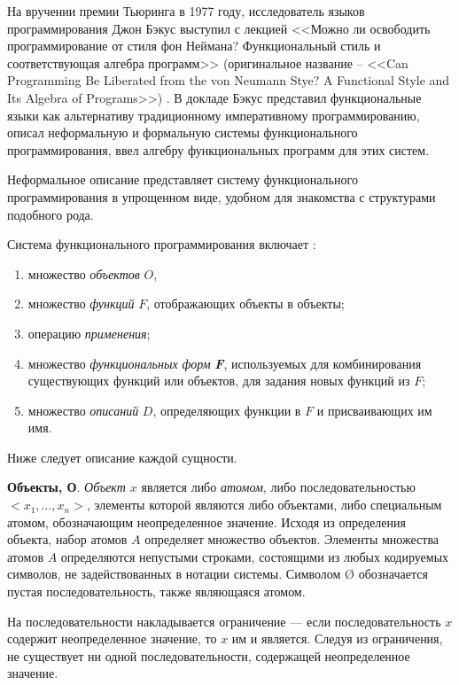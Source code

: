 На вручении премии Тьюринга в 1977 году, исследователь языков программирования Джон Бэкус
выступил с лекцией <<Можно ли освободить программирование от стиля фон Неймана? Функциональный
стиль и соответствующая алгебра программ>> (оригинальное название -- <<Can 
Programming Be Liberated from the von Neumann Stye? A Functional Style and
Its Algebra of Programs>>) \cite{backus77}. В докладе Бэкус представил функциональные языки
как альтернативу традиционному императивному программированию, описал
неформальную и формальную системы функционального программирования, ввел
алгебру функциональных программ для этих систем.

Неформальное описание представляет систему функционального программирования
в упрощенном виде, удобном для знакомства с структурами подобного рода.

Система функционального программирования включает \cite[с.~620]{backus77}:
\begin{enumerate}
    \item множество \textit{объектов} $O$,
    \item множество \textit{функций} $F$, отображающих объекты в объекты;
    \item операцию \textit{применения};
    \item множество \textit{функциональных форм} \textit{\textbf{F}}, 
    используемых для комбинирования существующих функций или объектов,
    для задания новых функций из $F$;
    \item множество \textit{описаний} $D$, определяющих функции в $F$ и присваивающих им имя.
\end{enumerate}

Ниже следует описание каждой сущности.

\textbf{Объекты, О}. \textit{Объект $x$} является либо \textit{атомом},
либо последовательностью $<x_1, \dots, x_n>$, элементы которой являются
либо объектами, либо специальным атомом, обозначающим неопределенное значение.
Исходя из определения объекта, набор атомов $A$ определяет множество
объектов. Элементы множества атомов $A$ определяются непустыми строками,
состоящими из любых кодируемых символов, не задействованных в нотации системы.
Символом {\O} обозначается пустая последовательность, также являющаяся
атомом.

На последовательности накладывается ограничение --- если последовательность $x$
содержит неопределенное значение, то $x$ им и является. Следуя из ограничения,
не существует ни одной последовательности, содержащей неопределенное значение.

